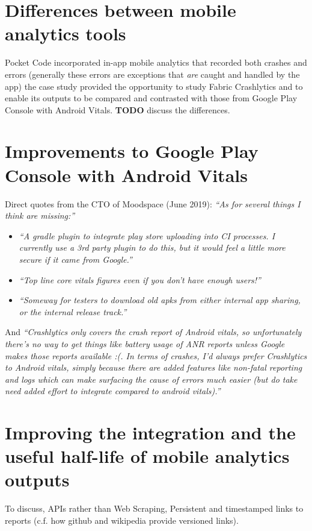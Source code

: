 \section{Differences between mobile analytics tools}
Pocket Code incorporated in-app mobile analytics that recorded both crashes and errors (generally these errors are exceptions that \textit{are} caught and handled by the app) the case study provided the opportunity to study Fabric Crashlytics and to enable its outputs to be compared and contrasted with those from Google Play Console with Android Vitals. \textbf{TODO} discuss the differences.


\section{Improvements to Google Play Console with Android Vitals}

Direct quotes from the CTO of Moodspace (June 2019): \emph{``As for several things I think are missing:''}
\begin{itemize}
    \item \textit{``A gradle plugin to integrate play store uploading into CI processes. I currently use a 3rd party plugin to do this, but it would feel a little more secure if it came from Google.''}
    \item \textit{``Top line core vitals figures even if you don't have enough users!''}
    \item \textit{``Someway for testers to download old apks from either internal app sharing, or the internal release track.''}
\end{itemize}

And \emph{``Crashlytics only covers the crash report of Android vitals, so unfortunately there's no way to get things like battery usage of ANR reports unless Google makes those reports available :(. In terms of crashes, I'd always prefer Crashlytics to Android vitals, simply because there are added features like non-fatal reporting and logs which can make surfacing the cause of errors much easier (but do take need added effort to integrate compared to android vitals).''}

\section{Improving the integration and the useful half-life of mobile analytics outputs}
To discuss, APIs rather than Web Scraping, Persistent and timestamped links to reports (c.f. how github and wikipedia provide versioned links).


